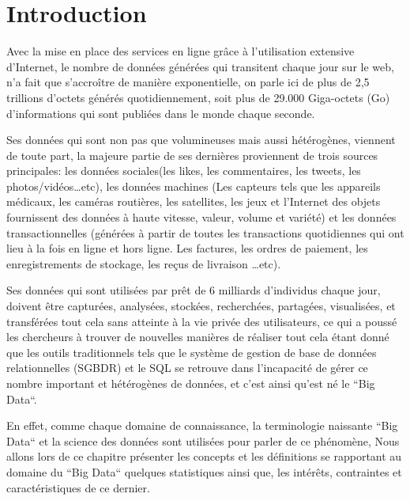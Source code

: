 \section*{Introduction}
Avec la mise en place des services en ligne grâce à l’utilisation extensive d’Internet, le nombre de données générées qui transitent chaque jour sur le web, n'a fait que s'accroître de manière exponentielle, on parle ici de plus de 2,5 trillions d'octets générés quotidiennement, soit plus de 29.000 Giga-octets (Go) d'informations qui sont publiées dans le monde chaque seconde.

Ses données qui sont non pas que volumineuses mais aussi hétérogènes, viennent de toute part, la majeure partie de ses dernières proviennent de trois sources principales: les données sociales(les likes, les commentaires, les tweets, les photos/vidéos…etc), les données machines (Les capteurs tels que les appareils médicaux, les caméras routières, les satellites, les jeux et l'Internet des objets fournissent des données à haute vitesse, valeur, volume et variété) et les données transactionnelles (générées à partir de toutes les transactions quotidiennes qui ont lieu à la fois en ligne et hors ligne. Les factures, les ordres de paiement, les enregistrements de stockage, les reçus de livraison …etc).

Ses données qui sont utilisées par prêt de 6 milliards d'individus chaque jour, doivent être capturées, analysées,  stockées, recherchées,  partagées, visualisées, et transférées tout cela sans atteinte à la vie privée des utilisateurs, ce qui a poussé les chercheurs à trouver de nouvelles manières de réaliser tout cela étant donné que les outils traditionnels tels que le système de gestion de base de données relationnelles (SGBDR) et le SQL se retrouve dans l’incapacité de gérer ce nombre important et hétérogènes de données, et c’est ainsi qu’est né le “Big Data“.

En effet, comme chaque domaine de connaissance, la terminologie naissante “Big Data“ et la science des données sont utilisées pour parler de ce phénomène, Nous allons lors de ce chapitre présenter les concepts et les définitions se rapportant au domaine du “Big Data“ quelques statistiques ainsi que, les intérêts, contraintes et caractéristiques de ce dernier.
